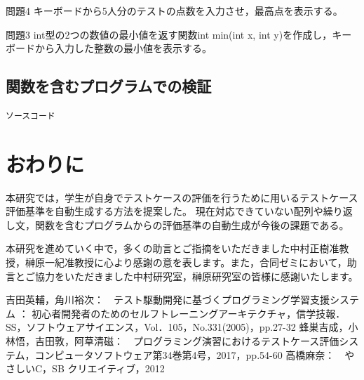 \documentclass{tpu-sotu}
\begin{document}


\begin{itembox}[l]{問題4}
キーボードから5人分のテストの点数を入力させ，最高点を表示する。
\end{itembox}



\begin{itembox}[l]{問題3}
int型の2つの数値の最小値を返す関数int min(int x, int y)を作成し，キーボードから入力した整数の最小値を表示する。
\end{itembox}



\section{関数を含むプログラムでの検証}


\begin{lstlisting}[xleftmargin=1cm]
   ソースコード
\end{lstlisting}
\chapter{おわりに}
本研究では，学生が自身でテストケースの評価を行うために用いるテストケース評価基準を自動生成する方法を提案した。
現在対応できていない配列や繰り返し文，関数を含むプログラムからの評価基準の自動生成が今後の課題である。

\acknowledgements
本研究を進めていく中で，多くの助言とご指摘をいただきました中村正樹准教授，榊原一紀准教授に心より感謝の意を表します。また，合同ゼミにおいて，助言とご協力をいただきました中村研究室，榊原研究室の皆様に感謝いたします。
\begin{thebibliography}{2}
    吉田英輔，角川裕次：　テスト駆動開発に基づくプログラミング学習支援システム ： 初心者開発者のためのセルフトレーニングアーキテクチャ，信学技報．\\SS，ソフトウェアサイエンス，Vol．105，No.331(2005)，pp.27-32
    蜂巣吉成，小林悟，吉田敦，阿草清磁：　プログラミング演習におけるテストケース評価システム，コンピュータソフトウェア第34巻第4号，2017，pp.54-60
    高橋麻奈：　やさしいC，SB クリエイティブ，2012
\end{thebibliography}
\end{document}
